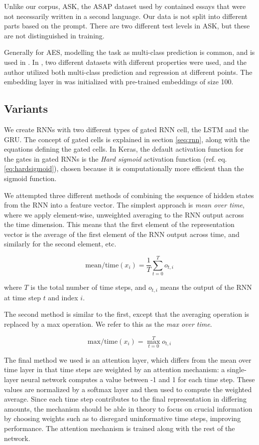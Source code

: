 Unlike our corpus, ASK, the ASAP dataset used by \citeauthor{taghipour16}
contained essays that were not necessarily written in a second language. Our
data is not split into different parts based on the prompt. There are two
different test levels in ASK, but these are not distinguished in training.

 Generally for \ac{AES}, modelling
the task as multi-class prediction is common, and is used in
\textcite{vajjala18universalCEFR}. In \textcite{vajjala17}, two different
datasets with different properties were used, and the author utilized both
multi-class prediction and regression at different points. The embedding
layer in \textcite{taghipour16} was initialized with pre-trained embeddings
of size 100.


\subsection{Variants}

We create \acp{RNN} with two different types of gated \ac{RNN} cell, the
\ac{LSTM} and the \ac{GRU}. The concept of gated cells is explained in
section \ref{seq:rnn}, along with the equations defining the gated cells. In
Keras, the default activation function for the gates in gated RNNs is the
\emph{Hard sigmoid} activation function (ref. eq. \ref{eq:hardsigmoid}),
chosen because it is computationally more efficient than the sigmoid
function.

We attempted three different methods of combining the sequence of hidden
states from the \ac{RNN} into a feature vector. The simplest approach is
\emph{mean over time}, where we apply element-wise, unweighted averaging to
the RNN output across the time dimension. This means that the first element
of the representation vector is the average of the first element of the RNN
output across time, and similarly for the second element, etc.

\[
  \mathrm{mean/time}(x_i) = \frac{1}{T}\sum_{t=0}^T o_{t,i}
\]

where $T$ is the total number of time steps, and $o_{t,i}$ means the output of
the RNN at time step $t$ and index $i$.

The second method is similar to the first, except that the averaging
operation is replaced by a max operation. We refer to this as the \emph{max
over time}.

\[
  \mathrm{max/time}(x_i) = \max_{t=0}^T o_{t,i}
\]

The final method we used is an attention layer, which differs from the mean
over time layer in that time steps are weighted by an attention mechanism: a
single-layer neural network computes a value between -1 and 1 for each time
step. These values are normalized by a softmax layer and then used to compute
the weighted average. Since each time step contributes to the final
representation in differing amounts, the mechanism should be able in theory
to focus on crucial information by choosing weights such as to disregard
uninformative time steps, improving performance. The attention mechanism is
trained along with the rest of the network.

